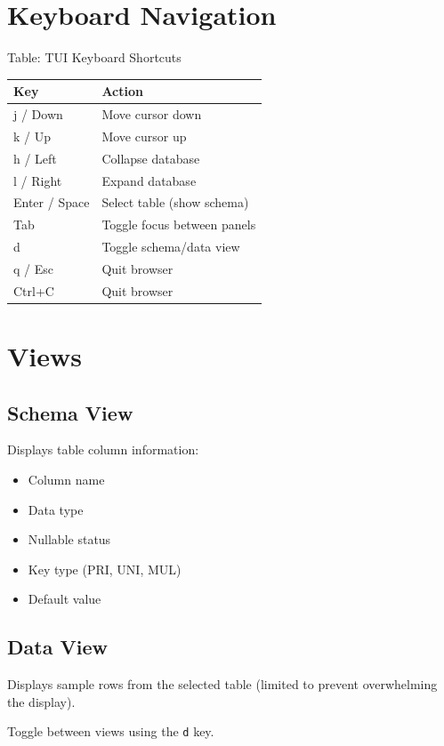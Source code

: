 \documentclass[11pt,a4paper]{report}
\begin{document}
\section{Keyboard Navigation}

Table: TUI Keyboard Shortcuts

\begin{tabular}{ll}
\toprule
Key & Action \\
\midrule
j / Down & Move cursor down \\
k / Up & Move cursor up \\
h / Left & Collapse database \\
l / Right & Expand database \\
Enter / Space & Select table (show schema) \\
Tab & Toggle focus between panels \\
d & Toggle schema/data view \\
q / Esc & Quit browser \\
Ctrl+C & Quit browser \\
\bottomrule
\end{tabular}

\section{Views}

\subsection{Schema View}

Displays table column information:
\begin{itemize}
    \item Column name
    \item Data type
    \item Nullable status
    \item Key type (PRI, UNI, MUL)
    \item Default value
\end{itemize}

\subsection{Data View}

Displays sample rows from the selected table (limited to prevent overwhelming the display).

Toggle between views using the \texttt{d} key.

\end{document}
